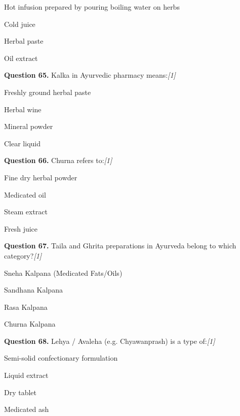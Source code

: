 \documentclass[11pt,a4paper]{article}
\newcommand{\pts}[1]{\hfill   \textit{[#1]}}
\begin{document}
\begin{parts}
  \item Hot infusion prepared by pouring boiling water on herbs
  \item Cold juice
  \item Herbal paste
  \item Oil extract
\end{parts}

\medskip




\noindent   \textbf{Question 65.} Kalka in Ayurvedic pharmacy means:\pts{1}

\begin{parts}
  \item Freshly ground herbal paste
  \item Herbal wine
  \item Mineral powder
  \item Clear liquid
\end{parts}

\medskip




\noindent   \textbf{Question 66.} Churna refers to:\pts{1}

\begin{parts}
  \item Fine dry herbal powder
  \item Medicated oil
  \item Steam extract
  \item Fresh juice
\end{parts}

\medskip




\noindent   \textbf{Question 67.} Taila and Ghrita preparations in Ayurveda belong to which category?\pts{1}

\begin{parts}
  \item Sneha Kalpana (Medicated Fats/Oils)
  \item Sandhana Kalpana
  \item Rasa Kalpana
  \item Churna Kalpana
\end{parts}

\medskip




\noindent   \textbf{Question 68.} Lehya / Avaleha (e.g. Chyawanprash) is a type of:\pts{1}

\begin{parts}
  \item Semi-solid confectionary formulation
  \item Liquid extract
  \item Dry tablet
  \item Medicated ash
\end{parts}
\end{document}
